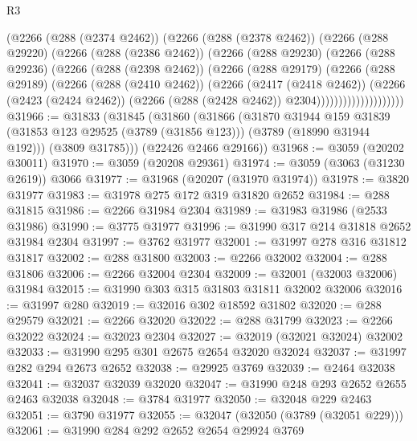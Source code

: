 \begin{lexlean}{R3}
\begin{coremodule}
                  (@2266
                    (@288 (@2374 @2462))
                    (@2266
                      (@288 (@2378 @2462))
                      (@2266
                        (@288 @29220)
                        (@2266
                          (@288 (@2386 @2462))
                          (@2266
                            (@288 @29230)
                            (@2266
                              (@288 @29236)
                              (@2266
                                (@288 (@2398 @2462))
                                (@2266
                                  (@288 @29179)
                                  (@2266
                                    (@288 @29189)
                                    (@2266
                                      (@288 (@2410 @2462))
                                      (@2266
                                        (@2417 (@2418 @2462))
                                        (@2266
                                          (@2423 (@2424 @2462))
                                          (@2266 (@288 (@2428 @2462)) @2304))))))))))))))))))))
@31966 := @31833
    (@31845
      (@31860
        (@31866
          (@31870
            @31944
            @159
            @31839
            (@31853 @123 @29525 (@3789 (@31856 @123)))
            (@3789 (@18990 @31944 @192)))
          (@3809 @31785)))
      (@22426 @2466 @29166))
@31968 := @3059 (@20202 @30011)
@31970 := @3059 (@20208 @29361)
@31974 := @3059 (@3063 (@31230 @2619)) @3066
@31977 := @31968 (@20207 (@31970 @31974))
@31978 := @3820 @31977
@31983 := @31978 @275 @172 @319 @31820 @2652
@31984 := @288 @31815
@31986 := @2266 @31984 @2304
@31989 := @31983 @31986 (@2533 @31986)
@31990 := @3775 @31977
@31996 := @31990 @317 @214 @31818 @2652 @31984 @2304
@31997 := @3762 @31977
@32001 := @31997 @278 @316 @31812 @31817
@32002 := @288 @31800
@32003 := @2266 @32002
@32004 := @288 @31806
@32006 := @2266 @32004 @2304
@32009 := @32001 (@32003 @32006) @31984
@32015 := @31990 @303 @315 @31803 @31811 @32002 @32006
@32016 := @31997 @280
@32019 := @32016 @302 @18592 @31802
@32020 := @288 @29579
@32021 := @2266 @32020
@32022 := @288 @31799
@32023 := @2266 @32022
@32024 := @32023 @2304
@32027 := @32019 (@32021 @32024) @32002
@32033 := @31990 @295 @301 @2675 @2654 @32020 @32024
@32037 := @31997 @282 @294 @2673 @2652
@32038 := @29925 @3769
@32039 := @2464 @32038
@32041 := @32037 @32039 @32020
@32047 := @31990 @248 @293 @2652 @2655 @2463 @32038
@32048 := @3784 @31977
@32050 := @32048 @229 @2463
@32051 := @3790 @31977
@32055 := @32047 (@32050 (@3789 (@32051 @229)))
@32061 := @31990 @284 @292 @2652 @2654 @29924 @3769

\end{coremodule}
\end{lexlean}
